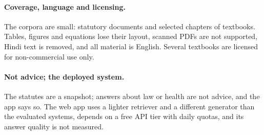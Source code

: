 \paragraph{Coverage, language and licensing.}
The corpora are small:  statutory documents and selected chapters of  textbooks. Tables, figures and equations lose their layout, scanned PDFs are not supported, Hindi text is removed, and all material is English. Several textbooks are licensed for non-commercial use only.

\paragraph{Not advice; the deployed system.}
The statutes are a snapshot; answers about law or health are not advice, and the app says so.
The web app uses a lighter retriever and a different generator than the evaluated systems, depends on a free API tier with daily quotas, and its answer quality is not measured.
